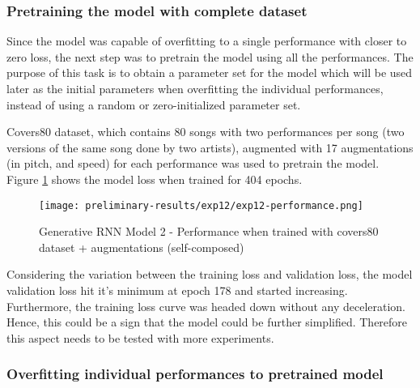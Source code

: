 \documentclass[../main.tex]{subfiles}
\begin{document}
\iffalse
\begin{figure}[H]
    \centering
    \texttt{[image: preliminary-results/exp10/exp10-performance.png]}
    \caption{Generative RNN Model 2 - Performance}
    \label{fig:exp10-performance}
\end{figure}
\fi

\subsubsection{Pretraining the model with complete dataset}

\par
Since the model was capable of overfitting to a single performance with closer to zero loss, the next step was to pretrain the model using all the performances. The purpose of this task is to obtain a parameter set for the model which will be used later as the initial parameters when overfitting the individual performances, instead of using a random or zero-initialized parameter set.

\par
Covers80 dataset, which contains 80 songs with two performances per song (two versions of the same song done by two artists), augmented with 17 augmentations (in pitch, and speed) for each performance was used to pretrain the model. Figure \ref{fig:exp12-performance} shows the model loss when trained for 404 epochs. 

\begin{figure}[H]
    \centering
    \texttt{[image: preliminary-results/exp12/exp12-performance.png]}
    \caption{Generative RNN Model 2 - Performance when trained with covers80 dataset + augmentations (self-composed)}
    \label{fig:exp12-performance}
\end{figure}

\par
Considering the variation between the training loss and validation loss, the model validation loss hit it's minimum at epoch 178 and started increasing. Furthermore, the training loss curve was headed down without any deceleration. Hence, this could be a sign that the model could be further simplified. Therefore this aspect needs to be tested with more experiments.



\subsubsection{Overfitting individual performances to pretrained model}
\end{document}
